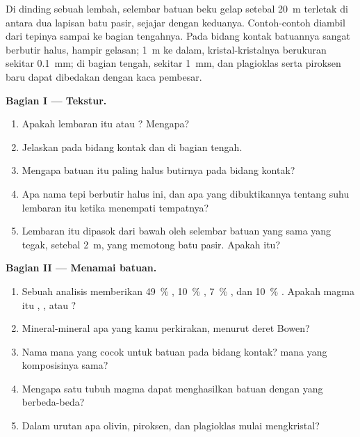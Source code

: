 \begin{problem}
\label{pb:g11:igneous-rocks:1}
Di dinding sebuah lembah, selembar batuan beku gelap setebal \qty{20}{m}
terletak di antara dua lapisan batu pasir, sejajar dengan keduanya. Contoh-contoh
diambil dari tepinya sampai ke bagian tengahnya. Pada bidang kontak batuannya
sangat berbutir halus, hampir gelasan; \qty{1}{m} ke dalam, kristal-kristalnya
berukuran sekitar \qty{0.1}{mm}; di bagian tengah, sekitar \qty{1}{mm}, dan
plagioklas serta piroksen baru dapat dibedakan dengan kaca pembesar.

\medskip
\noindent\textbf{Bagian I --- Tekstur.}
\begin{enumerate}
  \item Apakah lembaran itu  atau ? Mengapa?
  \item Jelaskan  pada bidang kontak dan di bagian tengah.
  \item Mengapa batuan itu paling halus butirnya pada bidang kontak?
  \item Apa nama tepi berbutir halus ini, dan apa yang dibuktikannya tentang
        suhu lembaran itu ketika menempati tempatnya?
  \item Lembaran itu dipasok dari bawah oleh selembar batuan yang sama yang
        tegak, setebal \qty{2}{m}, yang memotong batu pasir. Apakah itu?
\end{enumerate}

\medskip
\noindent\textbf{Bagian II --- Menamai batuan.}
\begin{enumerate}[resume]
  \item Sebuah analisis memberikan \qty{49}{\percent} , \qty{10}{\percent}
        , \qty{7}{\percent} , dan \qty{10}{\percent}
        . Apakah magma itu , , atau ?
  \item Mineral-mineral apa yang kamu perkirakan, menurut deret Bowen?
  \item Nama mana yang cocok untuk batuan pada bidang kontak? 
        mana yang komposisinya sama?
  \item Mengapa satu tubuh magma dapat menghasilkan batuan dengan  yang
        berbeda-beda?
  \item Dalam urutan apa olivin, piroksen, dan plagioklas mulai mengkristal?
\end{enumerate}


\end{problem}
